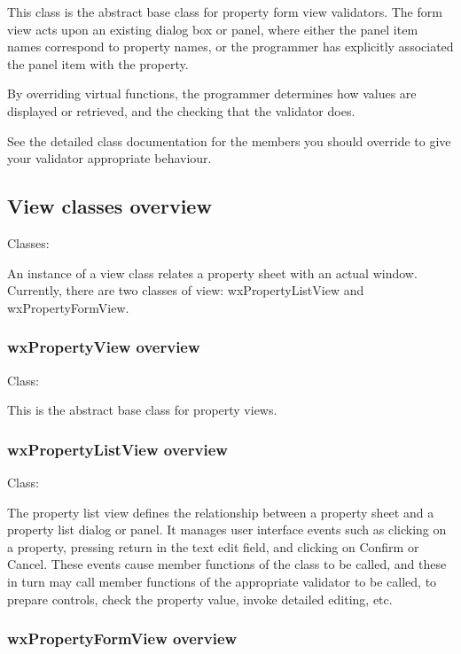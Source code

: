 This class is the abstract base class for property form view validators.
The form view acts upon an existing dialog box or panel, where either the
panel item names correspond to property names, or the programmer has explicitly
associated the panel item with the property.

By overriding virtual functions, the programmer determines how
values are displayed or retrieved, and the checking that the validator does.

See the detailed class documentation for the members you should override
to give your validator appropriate behaviour.

\subsection{View classes overview}\label{proplistviewoverview}

Classes: 

An instance of a view class relates a property sheet with an actual window.
Currently, there are two classes of view: wxPropertyListView and wxPropertyFormView.

\subsubsection{wxPropertyView overview}\label{wxpropertyviewoverview}

Class: 

This is the abstract base class for property views.

\subsubsection{wxPropertyListView overview}\label{wxpropertylistviewoverview}

Class: 

The property list view defines the relationship between a property sheet and
a property list dialog or panel. It manages user interface events such as
clicking on a property, pressing return in the text edit field, and clicking
on Confirm or Cancel. These events cause member functions of the
class to be called, and these in turn may call member functions of
the appropriate validator to be called, to prepare controls, check the property value,
invoke detailed editing, etc.

\subsubsection{wxPropertyFormView overview}\label{wxpropertyformviewoverview}

